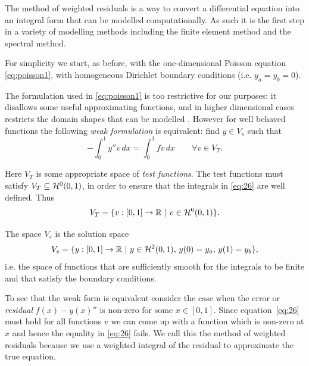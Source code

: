 The method of weighted residuals is a way to convert a differential equation
into an integral form that can be modelled computationally. As such it is the
first step in a variety of modelling methods including the finite element method
and the spectral method.

For simplicity we start, as before, with the one-dimensional Poisson equation
\eqref{eq:poisson1}, with homogeneous Dirichlet boundary conditions
(i.e. $y_{a}=y_{b}=0$).


The formulation used in \eqref{eq:poisson1} is too restrictive for our purposes:
it disallows some useful approximating functions, and in higher dimensional
cases restricts the domain shapes that can be modelled
\cite{HowardElmanDavidSilvester2006}. However for well behaved functions the
following \emph{weak formulation} is equivalent: find $y\in V_{s}$ such that
\begin{equation}
  -\int_{0}^{1}y''v\, dx=\int_{0}^{1}fv\, dx \qquad \forall v\in V_{T}.
  \label{eq:26}
\end{equation}

Here $V_{T}$ is some appropriate space of \emph{test functions}. The test
functions must satisfy $V_{T}\subseteq \mathcal{H}^0(0,1)$, in order to ensure that the integrals in \eqref{eq:26} are well defined. Thus
\begin{equation}
  \label{eq:28}
  V_{T}=\{v:[0,1]\rightarrow\mathbb{R}\, \,|\, \, v \in \mathcal{H}^0(0,1)\}.
\end{equation}

The space $V_{s}$ is the solution space
\begin{equation*}
  V_{s}=\{y:[0,1]\rightarrow\mathbb{R}\, \,|\, \, y \in \mathcal{H}^2(0,1),\,
  y(0) = y_{a},\, y(1) = y_{b}\},
\end{equation*}
 i.e. the space of functions that are sufficiently smooth for the integrals to be finite and that satisfy the boundary conditions.

To see that the weak form is equivalent consider the case when the error or \emph{residual} $f(x) -y(x)''$ is non-zero for some $x \in [0,1]$. Since equation~\eqref{eq:26} must hold for all functions $v$ we can come up with a function which is non-zero at $x$ and hence the equality in \eqref{eq:26} fails. We call this the method of weighted residuals because we use a weighted integral of the residual to approximate the true equation.\cite{Zeinkiewicz1967}%

